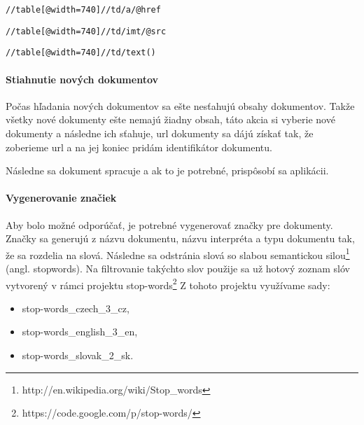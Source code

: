 \begin{lstlisting}[caption=XPath na vyhľadanie názvov piesní,label=lst:document_id]
//table[@width=740]//td/a/@href
\end{lstlisting}

\begin{lstlisting}[caption=XPath na vyhľadanie názvov piesní,label=lst:document_type]
//table[@width=740]//td/imt/@src
\end{lstlisting}

\begin{lstlisting}[caption=XPath na vyhľadanie názvov piesní,label=lst:document_interpret]
//table[@width=740]//td/text()
\end{lstlisting}

\paragraph{Stiahnutie nových dokumentov}

Počas hľadania nových dokumentov sa ešte nesťahujú obsahy dokumentov. Takže 
všetky nové dokumenty ešte nemajú žiadny obsah, táto akcia si vyberie nové dokumenty
a následne ich sťahuje, url dokumenty sa dájú získať tak, že zoberieme url
 a na jej
koniec pridám identifikátor dokumentu.

Následne sa dokument spracuje a ak to je potrebné, prispôsobí sa aplikácii.

\paragraph{Vygenerovanie značiek}

Aby bolo možné odporúčať, je potrebné vygenerovať značky pre dokumenty. Značky
sa generujú z názvu dokumentu, názvu interpréta a typu dokumentu tak, že sa rozdelia na
slová. Následne sa odstránia slová so slabou semantickou 
silou\footnote{http://en.wikipedia.org/wiki/Stop\_words}  (angl. stopwords).
Na filtrovanie takýchto slov použije sa už hotový zoznam slóv vytvorený v rámci 
projektu stop-words\footnote{https://code.google.com/p/stop-words/}
Z tohoto projektu využívame sady:

\begin{itemize}
\item{stop-words\_czech\_3\_cz,}
\item{stop-words\_english\_3\_en,}
\item{stop-words\_slovak\_2\_sk.}
\end{itemize}

